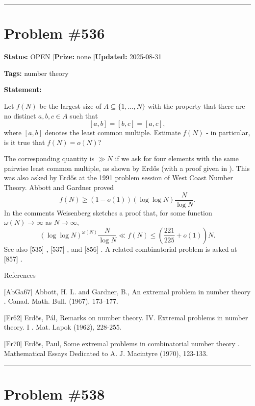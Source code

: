 \documentclass{article}
\begin{document}
\noindent\rule{\linewidth}{0.4pt}


\section{Problem \#536}
\label{prob:536}

\noindent\textbf{Status:} OPEN \quad|\quad \textbf{Prize:} none \quad|\quad \textbf{Updated:} 2025-08-31

\noindent\textbf{Tags:} number theory

\medskip

\noindent\textbf{Statement:}

Let $f(N)$ be the largest size of $A\subseteq \{1,\ldots,N\}$ with the property that there are no distinct $a,b,c\in A$ such that\[[a,b]=[b,c]=[a,c],\]where $[a,b]$ denotes the least common multiple. Estimate $f(N)$ - in particular, is it true that $f(N)=o(N)$?




The corresponding quantity is $\gg N$ if we ask for four elements with the same pairwise least common multiple, as shown by Erd\H{o}s \cite{Er62} (with a proof given in \cite{Er70}). This was also asked by Erd\H{o}s at the 1991 problem session of West Coast Number Theory. Abbott and Gardner \cite{AbGa67} proved\[f(N) \geq (1-o(1))(\log\log N)\frac{N}{\log N}.\]In the comments Weisenberg sketches a proof that, for some function $\omega(N)\to \infty$ as $N\to \infty$,\[(\log\log N)^{\omega(N)}\frac{N}{\log N}\ll f(N) \leq \left(\frac{221}{225}+o(1)\right)N.\]See also [535] , [537] , and [856] . A related combinatorial problem is asked at [857] .




References

[AbGa67] Abbott, H. L. and Gardner, B., An extremal problem in number theory . Canad. Math. Bull. (1967), 173--177.

[Er62] Erd\H{o}s, P\'{a}l, Remarks on number theory. IV. Extremal problems in number theory. I . Mat. Lapok (1962), 228-255.

[Er70] Erd\H{o}s, Paul, Some extremal problems in combinatorial number theory . Mathematical Essays Dedicated to A. J. Macintyre (1970), 123-133.

\noindent\rule{\linewidth}{0.4pt}


\section{Problem \#538}
\label{prob:538}
\end{document}
